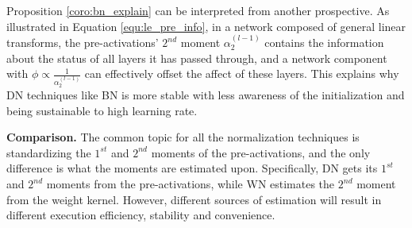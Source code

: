 \documentclass[10pt,journal,compsoc]{IEEEtran}
\newtheorem{prop}{Proposition}[section]
\begin{document}
Proposition \ref{coro:bn_explain} can be interpreted from another prospective. As illustrated in Equation \eqref{equ:le_pre_info}, in a network composed of general linear transforms, the pre-activations' $2^{nd}$ moment $\alpha_2^{(l-1)}$ contains the information about the status of all layers it has passed through, and a network component with $\phi\propto \frac{1}{\alpha_2^{(l-1)}}$ can effectively offset the affect of these layers. This explains why DN techniques like BN is more stable with less awareness of the initialization and being sustainable to high learning rate.

\begin{comment}
\begin{proof}
With Proposition \ref{prop:general_linear_transforms}, all the components of the network are general linear transforms. As the second moment output activations of the data normalization is always $1$, with Proposition \ref{prop:evolution_2nd_norm_net }, $\phi(\mathbf{JJ}^T)=\frac{\alpha_2(output)}{\alpha_2(input)}=\frac{\beta}{\alpha_2^{(0)}}$.

\end{proof}



 illustrates another property of data normalization that has been neglected by previous works: with Proposition \ref{prop:evolution_2nd_norm_net }, the second moment of the last data normalization's input is $\alpha_2=\Pi_i\phi(\mathbf{J_iJ_i}^T)\alpha_2^{(0)}$, which contains the information about the status of all the layer it has passed through. According to Table \ref{tab:parts_library}, for data normalization, $\phi(\mathbf{JJ}^T)=\frac{1}{\sigma_B^2}$. As data normalization is applied after linear transform, $\sigma_B^2=\alpha_2$, thus data normalization offset the affect of all its previous layers based on the information carried by $\sigma_B^2$.  Inspired by these discussions, we propose the proposition as follows.
\begin{prop}
A network component whose Jacobian matrix $\mathbf{J}$ satisfies $\phi(\mathbf{JJ}^T)\propto \frac{1}{\alpha_2}$ can stabilize the network composed of general linear transforms (Definition \ref{def:general_linear_transformation}), the $\alpha_2$ denotes the second moment of input data.
\label{prop:network_stabilizer}
\end{prop}
\end{comment}

\textbf{Comparison.} The common topic for all the normalization techniques is standardizing the $1^{st}$ and $2^{nd}$ moments of the pre-activations, and the only difference is what the moments are estimated upon. Specifically, DN gets its $1^{st}$ and $2^{nd}$ moments from the pre-activations, while WN estimates the $2^{nd}$ moment from the weight kernel. However, different sources of estimation will result in different execution efficiency, stability and convenience.
\end{document}
